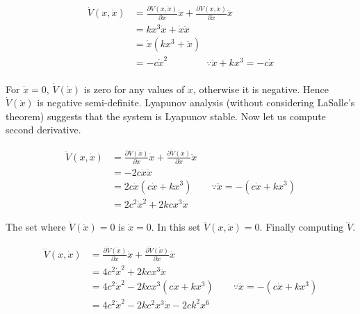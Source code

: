 \documentclass[12pt, a4paper]{article}
\begin{document}
\begin{equation*}
    \begin{split}
        \dot{V}(x,\dot{x})&=\frac{\partial V(x,\dot{x})}{\partial x}\dot{x}+\frac{\partial V(x,\dot{x})}{\partial \dot{x}}\ddot{x}\\
        &=kx^{3}\dot{x}+\dot{x}\ddot{x}\\
        &=\dot{x}(kx^{3}+\ddot{x})\\
        &=-c\dot{x}^{2}\quad\quad\quad\quad\because\ddot{x}+kx^{3}=-c\dot{x}\\
    \end{split}
\end{equation*}

For $\dot{x}=0$, $\dot{V}(\dot{x})$ is zero for any values of $x$, otherwise it is negative. Hence $\dot{V}(\dot{x})$ is negative semi-definite. Lyapunov analysis (without considering LaSalle's theorem) suggests that the system is Lyapunov stable. Now let us compute second derivative.

\begin{equation*}
    \begin{split}
        \ddot{V}(x,\dot{x})&=\frac{\partial \dot{V}(\dot{x})}{\partial x}\dot{x}+\frac{\partial \dot{V}(\dot{x})}{\partial \dot{x}}\ddot{x}\\
        &=-2c\dot{x}\ddot{x}\\
        &=2c\dot{x}(c\dot{x}+kx^{3})\quad\quad\because\ddot{x}=-(c\dot{x}+kx^{3})\\
        &=2c^{2}\dot{x}^{2}+2kcx^{3}\dot{x}
    \end{split}
\end{equation*}

The set where $\dot{V}(\dot{x})=0$ is $\dot{x}=0$. In this set $\ddot{V}(x,\dot{x})=0$. Finally computing $\dddot{V}$.

\begin{equation*}
    \begin{split}
        \dddot{V}(x,\dot{x})&=\frac{\partial\ddot{V}(\dot{x})}{\partial x}\dot{x}+\frac{\partial \ddot{V}(\dot{x})}{\partial \dot{x}}\ddot{x}\\
        &=4c^{2}\dot{x}^{2}+2kcx^{3}\ddot{x}\\
        &=4c^{2}\dot{x}^{2}-2kcx^{3}(c\dot{x}+kx^{3})\quad\quad\because\ddot{x}=-(c\dot{x}+kx^{3})\\
        &=4c^{2}\dot{x}^{2}-2kc^{2}x^{3}\dot{x}-2ck^{2}x^{6}\\
    \end{split}
\end{equation*}
\end{document}
